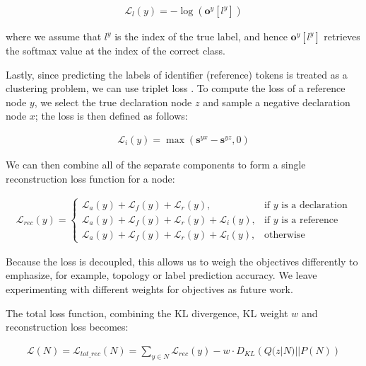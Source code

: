 \begin{align}
    \mathcal{L}_{l}(y) = - \log(\mathbf{o}^y[l^y])
\end{align}

\noindent where we assume that $l^y$ is the index of the true label, and hence $\mathbf{o}^y[l^y]$ retrieves the softmax value at the index of the correct class. 

Lastly, since predicting the labels of identifier (reference) tokens is treated as a clustering problem, we can use triplet loss \cite{chechik2010large}. 
To compute the loss of a reference node $y$, we select the true declaration node $z$ and sample a negative declaration node $x$; the loss is then defined as follows:

\begin{align}
    \mathcal{L}_i(y)=\max(\mathbf{s}^{yx} - \mathbf{s}^{yz},0)
\end{align}

\noindent We can then combine all of the separate components to form a single reconstruction loss function for a node:

\begin{small}
\begin{align}
   \mathcal{L}_{rec}(y) = 
\begin{cases}
    \mathcal{L}_{a}(y) + \mathcal{L}_{f}(y) + \mathcal{L}_{r}(y),& \text{if } y \text{ is a declaration} \\
    \mathcal{L}_{a}(y) + \mathcal{L}_{f}(y) + \mathcal{L}_{r}(y) + \mathcal{L}_{i}(y),& \text{if } y \text{ is a reference} \\
    \mathcal{L}_{a}(y) + \mathcal{L}_{f}(y) + \mathcal{L}_{r}(y) + \mathcal{L}_{l}(y),& \text{otherwise}
\end{cases}
\end{align}
\end{small}

Because the loss is decoupled, this allows us to weigh the objectives differently to emphasize, for example, topology or label prediction accuracy. We leave experimenting with different weights for objectives as future work. 

The total loss function, combining the KL divergence, KL weight $w$ and reconstruction loss becomes:

\begin{align}
    \mathcal{L}(N) = \mathcal{L}_{tot\_rec}(N) = \sum_{y \in N}\mathcal{L}_{rec}(y) - w \cdot D_{KL}\left(Q(z|N)||P(N)\right)
\end{align}

